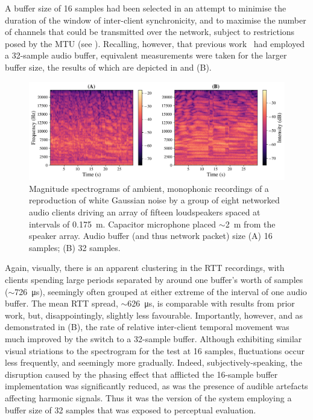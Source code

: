 A buffer size of 16 samples had been selected in an attempt to minimise the
duration of the window of inter-client synchronicity, and to maximise the
number of channels that could be transmitted over the network, subject to
restrictions posed by the MTU (see ).
Recalling, however, that previous work~\citep{rushton_microcontroller-based_2023}
had employed a 32-sample audio buffer, equivalent measurements were taken for
the larger buffer size, the results of which are depicted in
 and (B).

\begin{figure}[ht]
    \centering
    \includegraphics[width=\textwidth]{figures/wgn_specgram_16_32}
    \caption{
        Magnitude spectrograms of ambient, monophonic recordings of a
        reproduction of white Gaussian noise by a group of eight networked
        audio clients driving an array of fifteen loudspeakers spaced at
        intervals of \qty{.175}{\m}.
        Capacitor microphone placed $\sim$\qty{2}{\m} from the
        speaker array.
        Audio buffer (and thus network packet) size (A) 16 samples;
        (B) 32 samples.
    }
    \label{fig:spectrograms}
\end{figure}

Again, visually, there is an apparent clustering in the RTT recordings, with
clients spending large periods separated by around one buffer's worth of
samples ($\sim$\qty{726}{\us}), seemingly often grouped at either
extreme of the interval of one audio buffer.
The mean RTT spread, $\sim$\qty{626}{\us}, is comparable with results
from prior work, but, disappointingly, slightly less favourable.
Importantly, however, and as demonstrated in (B), the
rate of relative inter-client temporal movement was much improved by the switch
to a 32-sample buffer.
Although exhibiting similar visual striations to the spectrogram for the test
at 16 samples, fluctuations occur less frequently, and seemingly more
gradually.
Indeed, subjectively-speaking, the disruption caused by the phasing effect
that afflicted the 16-sample buffer implementation was significantly reduced,
as was the presence of audible artefacts affecting harmonic signals.
Thus it was the version of the system employing a buffer size of 32 samples
that was exposed to perceptual evaluation.


